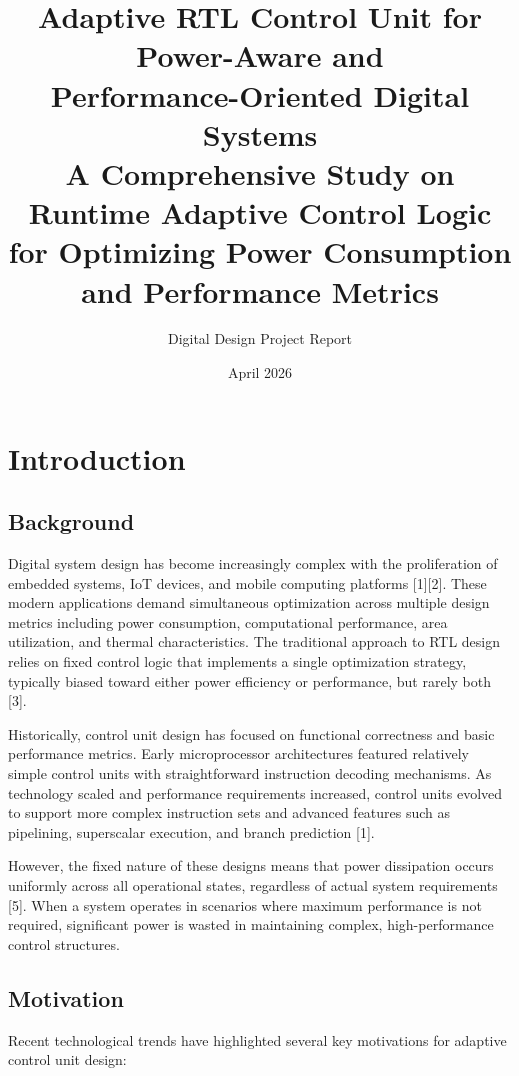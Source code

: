 \documentclass[15pt,a4paper]{report}
\title{
    \textbf{Adaptive RTL Control Unit for Power-Aware and \\
    Performance-Oriented Digital Systems}\\
    \vspace{0.5cm}
    \large A Comprehensive Study on Runtime Adaptive Control Logic \\
    for Optimizing Power Consumption and Performance Metrics
}
\author{
    \large Digital Design Project Report
}
\date{\large April 2026}
\begin{document}
\tableofcontents
\newpage

\chapter{Introduction}

\section{Background}

Digital system design has become increasingly complex with the proliferation of embedded systems, IoT devices, and mobile computing platforms [1][2]. These modern applications demand simultaneous optimization across multiple design metrics including power consumption, computational performance, area utilization, and thermal characteristics. The traditional approach to RTL design relies on fixed control logic that implements a single optimization strategy, typically biased toward either power efficiency or performance, but rarely both [3].

Historically, control unit design has focused on functional correctness and basic performance metrics. Early microprocessor architectures featured relatively simple control units with straightforward instruction decoding mechanisms. As technology scaled and performance requirements increased, control units evolved to support more complex instruction sets and advanced features such as pipelining, superscalar execution, and branch prediction [1].

However, the fixed nature of these designs means that power dissipation occurs uniformly across all operational states, regardless of actual system requirements [5]. When a system operates in scenarios where maximum performance is not required, significant power is wasted in maintaining complex, high-performance control structures.

\section{Motivation}

Recent technological trends have highlighted several key motivations for adaptive control unit design:
\end{document}
